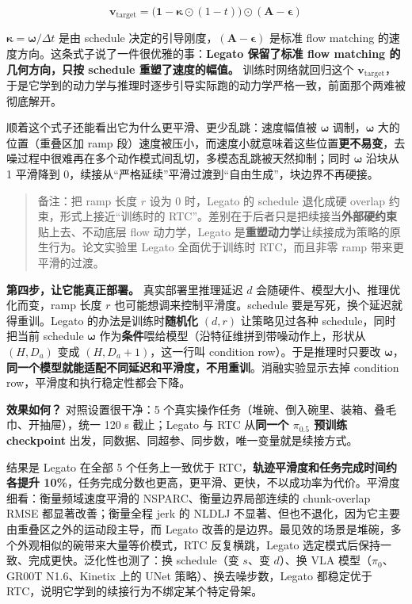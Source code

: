 \documentclass[
  chinese,
]{ctexart}
\begin{document}
\[\mathbf{v}_{\text{target}} = \bigl(\mathbf{1} - \boldsymbol{\kappa} \odot (1-t)\bigr) \odot (\mathbf{A} - \boldsymbol{\epsilon})\]

\(\boldsymbol{\kappa} = \boldsymbol{\omega}/\Delta t\) 是由 schedule
决定的引导刚度，\((\mathbf{A} - \boldsymbol{\epsilon})\) 是标准 flow
matching 的速度方向。这条式子说了一件很优雅的事：\textbf{Legato
保留了标准 flow matching 的几何方向，只按 schedule 重塑了速度的幅值。}
训练时网络就回归这个
\(\mathbf{v}_{\text{target}}\)，于是它学到的动力学与推理时逐步引导实际跑的动力学严格一致，前面那个两难被彻底解开。

顺着这个式子还能看出它为什么更平滑、更少乱跳：速度幅值被
\(\boldsymbol{\omega}\) 调制，\(\boldsymbol{\omega}\) 大的位置（重叠区加
ramp
段）速度被压小，而速度小就意味着这些位置\textbf{更不易变}，去噪过程中很难再在多个动作模式间乱切，多模态乱跳被天然抑制；同时
\(\boldsymbol{\omega}\) 沿块从 1 平滑降到
0，续接从``严格延续''平滑过渡到``自由生成''，块边界不再硬接。

\begin{quote}
备注：把 ramp 长度 \(r\) 设为 0 时，Legato 的 schedule 退化成硬 overlap
约束，形式上接近``训练时的
RTC''。差别在于后者只是把续接当\textbf{外部硬约束}贴上去、不动底层 flow
动力学，Legato 是\textbf{重塑动力学}让续接成为策略的原生行为。论文实验里
Legato 全面优于训练时 RTC，而且非零 ramp 带来更平滑的过渡。
\end{quote}

\textbf{第四步，让它能真正部署。} 真实部署里推理延迟 \(d\)
会随硬件、模型大小、推理优化而变，ramp 长度 \(r\)
也可能想调来控制平滑度。schedule 要是写死，换个延迟就得重训。Legato
的办法是训练时\textbf{随机化} \((d, r)\) 让策略见过各种
schedule，同时把当前 schedule \(\boldsymbol{\omega}\)
作为\textbf{条件}喂给模型（沿特征维拼到带噪动作上，形状从 \((H, D_a)\)
变成 \((H, D_a+1)\)，这一行叫 condition row）。于是推理时只要改
\(\boldsymbol{\omega}\)，\textbf{同一个模型就能适配不同延迟和平滑度，不用重训}。消融实验显示去掉
condition row，平滑度和执行稳定性都会下降。

\textbf{效果如何？} 对照设置很干净：5
个真实操作任务（堆碗、倒入碗里、装箱、叠毛巾、开抽屉），统一 120 s
截止；Legato 与 RTC 从\textbf{同一个 \(\pi_{0.5}\) 预训练 checkpoint}
出发，同数据、同超参、同步数，唯一变量就是续接方式。

结果是 Legato 在全部 5 个任务上一致优于
RTC，\textbf{轨迹平滑度和任务完成时间约各提升
10\%}，任务完成分数也更高，更平滑、更快，不以成功率为代价。平滑度细看：衡量频域速度平滑的
NSPARC、衡量边界局部连续的 chunk-overlap RMSE 都显著改善；衡量全程 jerk
的 NLDLJ 不显著、但也不退化，因为它主要由重叠区之外的运动段主导，而
Legato
改善的是边界。最见效的场景是堆碗，多个外观相似的碗带来大量等价模式，RTC
反复横跳，Legato 选定模式后保持一致、完成更快。泛化性也测了：换
schedule（变 \(s\)、变 \(d\)）、换 VLA 模型（\(\pi_0\)、GR00T
N1.6、Kinetix 上的 UNet 策略）、换去噪步数，Legato 都稳定优于
RTC，说明它学到的续接行为不绑定某个特定骨架。
\end{document}

